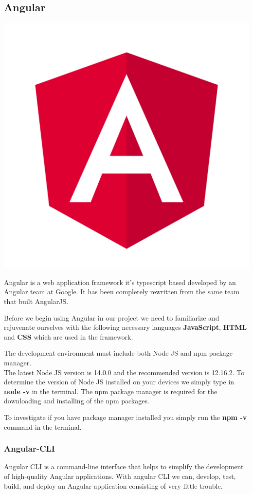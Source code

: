 \documentclass[a4paper,12pt]{report}
\begin{document}
\subsection{Angular}
\includegraphics[scale=.015]{images/angular.png}

Angular is a web application framework it's typescript based developed by an Angular team at Google.
It has been completely rewritten from the same team that built AngularJS.

Before we begin using Angular in our project we need to familiarize and rejuvenate ourselves with the following necessary languages \textbf{JavaScript}, \textbf{HTML} and \textbf{CSS} which are used in the framework.

The development environment must include both Node JS and npm package manager.\\
The latest Node JS version is 14.0.0 and the recommended version is 12.16.2. To determine the version of Node JS installed on your devices we simply type in \textbf{node -v} in the terminal.
The npm package manager is required for the downloading and installing of the npm packages.

To investigate if you have package manager installed you simply run the \textbf{npm -v} command in the terminal.\cite{angularSetup}

\subsubsection{Angular-CLI}
Angular CLI is a  command-line interface that helps to simplify the development of high-quality Angular applications. 
With angular CLI we can, develop, test, build, and deploy an Angular application consisting of very little trouble.
\end{document}
